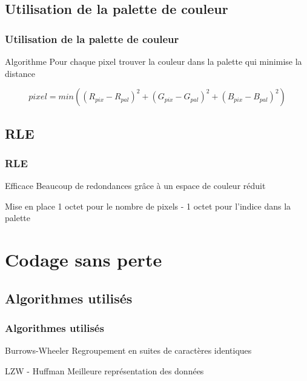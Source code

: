 \documentclass{beamer}
\begin{document}
\subsection{Utilisation de la palette de couleur}
\begin{frame}
  \frametitle{Utilisation de la palette de couleur}
  \begin{block}{Algorithme}
    Pour chaque pixel trouver la couleur dans la palette qui minimise la distance
  \end{block}
  \begin{block}{}
    $$ pixel = min((R_{pix} - R_{pal})^2 + (G_{pix} - G_{pal})^2 + (B_{pix} - B_{pal})^2) $$
  \end{block}
\end{frame}
\subsection{RLE}
  \begin{frame}
    \frametitle{RLE}
    \begin{block}{Efficace}
      Beaucoup de redondances grâce à un espace de couleur réduit
    \end{block}
    \begin{block}{Mise en place}
      1 octet pour le nombre de pixels - 1 octet pour l'indice dans la palette
    \end{block}
  \end{frame}
\section{Codage sans perte}
\subsection{Algorithmes utilisés}
\begin{frame}
  \frametitle{Algorithmes utilisés}
  \begin{block}{Burrows-Wheeler}
    Regroupement en suites de caractères identiques
  \end{block}
  \begin{block}{LZW - Huffman}
    Meilleure représentation des données
  \end{block}
\end{frame}
\end{document}
